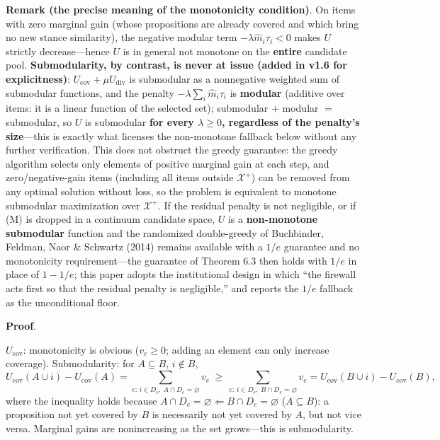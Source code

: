 \documentclass[
  11pt]{article}
\begin{document}
\textbf{Remark (the precise meaning of the monotonicity condition)}. On
items with zero marginal gain (whose propositions are already covered
and which bring no new stance similarity), the negative modular term
\(-\lambda\hat m_i\tau_i < 0\) makes \(U\) strictly decrease---hence
\(U\) is in general not monotone on the \textbf{entire} candidate pool.
\textbf{Submodularity, by contrast, is never at issue (added in v1.6 for
explicitness)}: \(U_{\mathrm{cov}} + \mu U_{\mathrm{div}}\) is
submodular as a nonnegative weighted sum of submodular functions, and
the penalty \(-\lambda\sum_i \hat m_i\tau_i\) is \textbf{modular}
(additive over items: it is a linear function of the selected set);
submodular \(+\) modular \(=\) submodular, so \(U\) is submodular
\textbf{for every \(\lambda \ge 0\), regardless of the penalty's
size}---this is exactly what licenses the non-monotone fallback below
without any further verification. This does not obstruct the greedy
guarantee: the greedy algorithm selects only elements of positive
marginal gain at each step, and zero/negative-gain items (including all
items outside \(\mathcal{X}^+\)) can be removed from any optimal
solution without loss, so the problem is equivalent to monotone
submodular maximization over \(\mathcal{X}^+\). If the residual penalty
is not negligible, or if (M) is dropped in a continuum candidate space,
\(U\) is a \textbf{non-monotone submodular} function and the randomized
double-greedy of Buchbinder, Feldman, Naor \& Schwartz (2014) remains
available with a \(1/e\) guarantee and no monotonicity requirement---the
guarantee of Theorem 6.3 then holds with \(1/e\) in place of \(1-1/e\);
this paper adopts the institutional design in which ``the firewall acts
first so that the residual penalty is negligible,'' and reports the
\(1/e\) fallback as the unconditional floor.

\textbf{Proof}.

\emph{\(U_{\mathrm{cov}}\)}: monotonicity is obvious (\(v_e \ge 0\);
adding an element can only increase coverage). Submodularity: for
\(A \subseteq B\), \(i \notin B\),
\[U_{\mathrm{cov}}(A \cup i) - U_{\mathrm{cov}}(A) = \sum_{e:\, i \in D_e,\ A \cap D_e = \varnothing} v_e \ \ge\ \sum_{e:\, i \in D_e,\ B \cap D_e = \varnothing} v_e = U_{\mathrm{cov}}(B \cup i) - U_{\mathrm{cov}}(B),\]
where the inequality holds because
\(A \cap D_e = \varnothing \Leftarrow B \cap D_e = \varnothing\)
(\(A \subseteq B\)): a proposition not yet covered by \(B\) is
necessarily not yet covered by \(A\), but not vice versa. Marginal gains
are nonincreasing as the set grows---this is submodularity.
\end{document}
